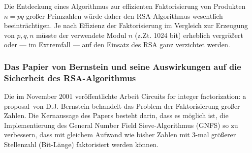 \begin{refsegment}
Die Entdeckung eines Algorithmus zur effizienten Faktorisierung von
Produkten $n=pq$ großer Primzahlen würde daher den RSA-Algorithmus
wesentlich beeinträchtigen. Je nach Effizienz der Faktorisierung im
Vergleich zur Erzeugung von $p, q, n$ müsste der verwendete Modul $n$
(z.Zt. 1024 bit) erheblich vergrößert oder --- im Extremfall --- auf
den Einsatz des RSA ganz verzichtet werden.


\subsubsection{Das Papier von Bernstein und seine Auswirkungen auf die Sicherheit
               des RSA-Algorithmus}
\label{RSABernstein} 
Die im November 2001 veröffentlichte Arbeit \glqq Circuits for integer
factorization: a proposal\grqq~von D.J. Bernstein \cite{Bernstein2001}
behandelt das Problem der Faktorisierung großer Zahlen.
Die Kernaussage des Papers besteht darin, dass es möglich ist, die
Implementierung des General Number Field Sieve-Algorithmus (GNFS)
 so zu
verbessern, dass mit gleichem Aufwand wie bisher Zahlen mit 3-mal
größerer Stellenzahl (Bit-Länge) faktorisiert werden können.


\end{refsegment}
